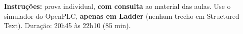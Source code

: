 \documentclass{../avaliacao}
\begin{document}
\imprimecabecalho

\begin{center}
\textbf{Instruções:} prova individual, \textbf{com consulta} ao material das aulas.
Use o simulador do OpenPLC, \textbf{apenas em Ladder} (nenhum trecho em
Structured Text). Duração: 20h45 às 22h10 (85 min).
\end{center}
\vspace{0.5cm}

\begin{questions}



\tabelapontuacao

\end{questions}
\end{document}
